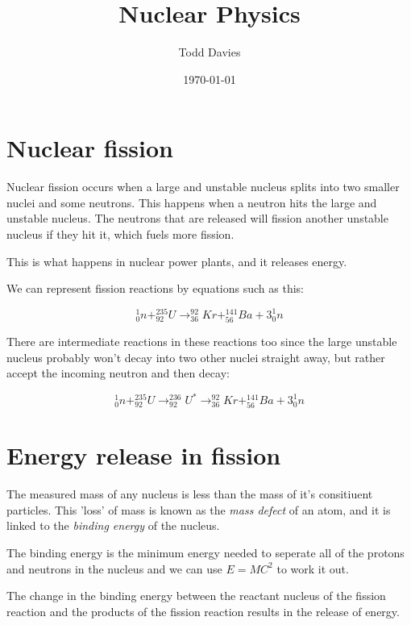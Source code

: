 \documentclass{article}
\title{Nuclear Physics}
\author{Todd Davies}
\date{\today}
\begin{document}
\lhead{\today}

\maketitle

\section*{Nuclear fission}
\thispagestyle{empty}

Nuclear fission occurs when a large and unstable nucleus splits into two smaller
nuclei and some neutrons. This happens when a neutron hits the large and
unstable nucleus. The neutrons that are released will fission another unstable
nucleus if they hit it, which fuels more fission.

This is what happens in nuclear power plants, and it releases energy.

We can represent fission reactions by equations such as this:

\[
	^{1}_{0}n + ^{235}_{92}U \rightarrow 
	^{92}_{36}Kr + ^{141}_{56}Ba + 3^{1}_{0}n
\]

There are intermediate reactions in these reactions too since the large unstable
nucleus probably won't decay into two other nuclei straight away, but rather
accept the incoming neutron and then decay:

\[
	^{1}_{0}n + ^{235}_{92}U \rightarrow 
	^{236}_{92}U^{*} \rightarrow
	^{92}_{36}Kr + ^{141}_{56}Ba + 3^{1}_{0}n
\]

\section*{Energy release in fission}

The measured mass of any nucleus is less than the mass of it's consitiuent
particles. This 'loss' of mass is known as the {\it mass defect} of an atom, and
it is linked to the {\it binding energy} of the nucleus.

The binding energy is the minimum energy needed to seperate all of the protons
and neutrons in the nucleus and we can use $E = MC^2$ to work it out.


The change in the binding energy between the reactant nucleus of the fission
reaction and the products of the fission reaction results in the release of
energy.
\end{document}

